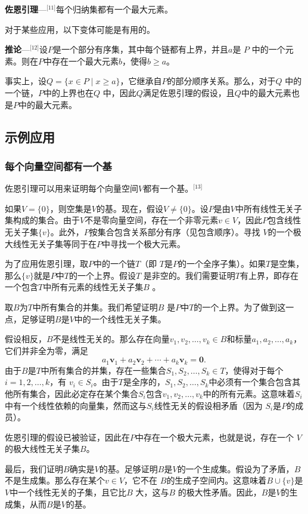 \textbf{佐恩引理}—\(^\text{[11]}\)每个归纳集都有一个最大元素。

对于某些应用，以下变体可能是有用的。

\textbf{推论}—\(^\text{[12]}\)设\( P \)是一个部分有序集，其中每个链都有上界，并且\( a \)是 \( P \) 中的一个元素。则在\( P \)中存在一个最大元素\( b \)，使得\( b \geq a \)。

事实上，设\( Q = \{x \in P \mid x \geq a\} \)，它继承自\( P \)的部分顺序关系。那么，对于\( Q \) 中的一个链，\( P \)中的上界也在\( Q \) 中，因此\( Q \)满足佐恩引理的假设，且\( Q \)中的最大元素也是\( P \)中的最大元素。
\subsection{示例应用}  
\subsubsection{每个向量空间都有一个基} 
佐恩引理可以用来证明每个向量空间\( V \)都有一个基。\(^\text{[13]}\)

如果\( V = \{0\} \)，则空集是\( V \)的基。现在，假设\( V \neq \{0\} \)。设\( P \)是由\( V \)中所有线性无关子集构成的集合。由于\( V \)不是零向量空间，存在一个非零元素\( v \in V \)，因此\( P \)包含线性无关子集\( \{v\} \)。此外，\( P \)按集合包含关系部分有序（见包含顺序）。寻找 \( V \)的一个极大线性无关子集等同于在\( P \)中寻找一个极大元素。

为了应用佐恩引理，取\( P \)中的一个链\( T \)（即 \( T \)是\( P \)的一个全序子集）。如果\( T \)是空集，那么\( \{v\} \)就是\( P \)中\( T \)的一个上界。假设\( T \) 是非空的。我们需要证明\( T \)有上界，即存在一个包含\( T \)中所有元素的线性无关子集\( B \) 。

取\( B \)为\( T \)中所有集合的并集。我们希望证明\( B \) 是\( P \)中\( T \)的一个上界。为了做到这一点，足够证明\( B \)是\( V \)中的一个线性无关子集。

假设相反，\( B \)不是线性无关的。那么存在向量\( v_1, v_2, \dots, v_k \in B \)和标量\( a_1, a_2, \dots, a_k \)，它们并非全为零，满足
\[
a_1 \mathbf{v}_1 + a_2 \mathbf{v}_2 + \cdots + a_k \mathbf{v}_k = \mathbf{0}.~
\]
由于\( B \)是\( T \)中所有集合的并集，存在一些集合\( S_1, S_2, \dots, S_k \in T \)，使得对于每个\( i = 1, 2, \dots, k \)，有 \( v_i \in S_i \)。由于\( T \)是全序的，\( S_1, S_2, \dots, S_k \)中必须有一个集合包含其他所有集合，因此必定存在某个集合\( S_i \)包含\( v_1, v_2, \dots, v_k \)中的所有元素。这意味着\( S_i \)中有一个线性依赖的向量集，然而这与\( S_i \)线性无关的假设相矛盾（因为 \( S_i \)是\( P \)的成员）。

佐恩引理的假设已被验证，因此在\( P \)中存在一个极大元素，也就是说，存在一个 \( V \)的极大线性无关子集\( B \)。

最后，我们证明\( B \)确实是\( V \)的基。足够证明\( B \)是\( V \)的一个生成集。假设为了矛盾，\( B \)不是生成集。那么存在某个\( v \in V \)，它不在 \( B \)的生成子空间内。这意味着\( B \cup \{v\} \)是 \( V \)中一个线性无关的子集，且它比\( B \) 大，这与\( B \) 的极大性矛盾。因此，\( B \)是\( V \)的生成集，从而\( B \)是\( V \)的基。